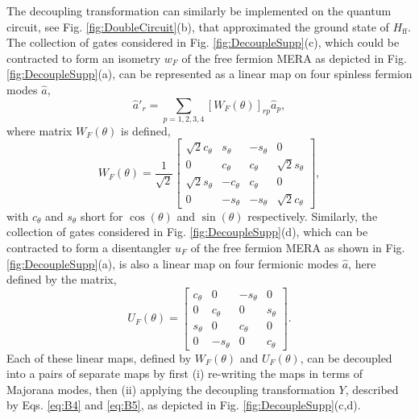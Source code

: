 \documentclass[aps,prl,twocolumn,showpacs,superscriptaddress,floatfix,10pt]{revtex4-1}
\begin{document}
The decoupling transformation can similarly be implemented on the quantum
circuit, see Fig. \ref{fig:DoubleCircuit}(b), that approximated the ground state
of $H_\textrm{ff}$. The collection of gates considered in
Fig. \ref{fig:DecoupleSupp}(c), which could be contracted to form an
isometry $w_F$ of the free fermion MERA as depicted in Fig. \ref{fig:DecoupleSupp}(a), can be represented as a linear map on four
spinless fermion modes  $\hat a$, 
\begin{equation}
{{\hat a'}_r} = \sum\limits_{p = 1,2,3,4} {{{\left[ {{W_F}(\theta )} \right]}_{rp}}{{\hat a}_p}}, 
\end{equation}
where matrix ${W_F}(\theta )$ is defined,
\begin{equation}
{W_F}(\theta ) = \frac{1}{{\sqrt 2 }}\left[ {\begin{array}{*{20}{c}}
  {\sqrt 2 {c_\theta }}&{{s_\theta }}&{ - {s_\theta }}&0 \\ 
  0&{{c_\theta }}&{{c_\theta }}&{\sqrt 2 {s_\theta }} \\ 
  {\sqrt 2 {s_\theta }}&{ - {c_\theta }}&{{c_\theta }}&0 \\ 
  0&{ - {s_\theta }}&{ - {s_\theta }}&{\sqrt 2 {c_\theta }} 
\end{array}} \right], \label{eq:B7}
\end{equation}
with $c_\theta $ and  $s_\theta $ short for $\cos(\theta)$ and $\sin(\theta)$ respectively. 
Similarly, the collection of gates considered in Fig. \ref{fig:DecoupleSupp}(d), 
which can be contracted to form a disentangler $u_F$ of the free fermion MERA as shown in Fig. \ref{fig:DecoupleSupp}(a), 
is also a linear map on four fermionic modes $\hat a$, here defined by the matrix,
\begin{equation}
{U_F}(\theta ) = \left[ {\begin{array}{*{20}{c}}
  {{c_\theta }}&0&{ - {s_\theta }}&0 \\ 
  0&{{c_\theta }}&0&{{s_\theta }} \\ 
  {{s_\theta }}&0&{{c_\theta }}&0 \\ 
  0&{ - {s_\theta }}&0&{{c_\theta }} 
\end{array}} \right]. \label{eq:B8}
\end{equation}
Each of these linear maps, defined by ${W_F}(\theta )$ and ${U_F}(\theta )$, can be 
decoupled into a pairs of separate maps by first (i) re-writing the maps in terms of 
Majorana modes, then (ii) applying the decoupling transformation $Y$, described by 
Eqs. \ref{eq:B4} and \ref{eq:B5}, as depicted in Fig. \ref{fig:DecoupleSupp}(c,d). 
\end{document}

